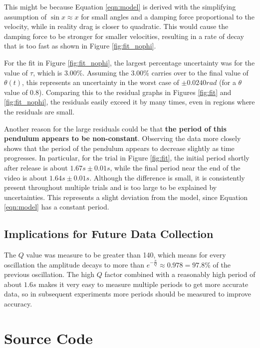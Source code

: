 \documentclass[aps,twocolumn,secnumarabic,nobalancelastpage,amsmath,amssymb,nofootinbib]{revtex4}
\begin{document}
This might be because Equation \ref{eqn:model} is derived with the simplifying assumption of \(\sin x \approx x\) for
small angles and a damping force proportional to the velocity, while in reality drag is closer to quadratic.
This would cause the damping force to be stronger for smaller velocities, resulting in a rate of decay that is too fast
as shown in Figure \ref{fig:fit_nophi}.

For the fit in Figure \ref{fig:fit_nophi}, the largest percentage uncertainty was for the value of \(\tau\), which is
3.00\%. Assuming the 3.00\% carries over to the final value of \(\theta(t)\), this represents an uncertainty in the
worst case of \(\pm 0.0240\si{rad}\) (for a \(\theta\) value of 0.8). Comparing this to the residual graphs in Figures
\ref{fig:fit} and \ref{fig:fit_nophi}, the residuals easily exceed it by many times, even in regions where the
residuals are small.

Another reason for the large residuals could be that \textbf{the period of this pendulum appears to be non-constant}.
Observing the data more closely shows that the period of the pendulum appears to decrease slightly as time progresses.
In particular, for the trial in Figure \ref{fig:fit}, the initial period shortly after release is about
\(1.67\si{s} \pm 0.01\si{s}\), while the final period near the end of the video is about \(1.64\si{s} \pm 0.01\si{s}\).
Although the difference is small, it is consistently present throughout multiple trials and is too large to be explained
by uncertainties. This represents a slight deviation from the model, since Equation \ref{eqn:model} has a constant
period.

\subsection{Implications for Future Data Collection}

The \(Q\) value was measure to be greater than 140, which means for every oscillation the amplitude decays to more than
\(e^{-\frac{\pi}{Q}} \approx 0.978 = 97.8\%\) of the previous oscillation. The high \(Q\) factor combined with a
reasonably high period of about \(1.6\si{s}\) makes it very easy to measure multiple periods to get more accurate data,
so in subsequent experiments more periods should be measured to improve accuracy.


\appendix
\section{Source Code}
\end{document}
